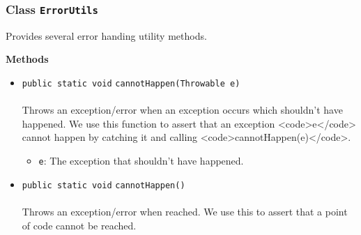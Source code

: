 \subsubsection{Class \lstinline|ErrorUtils|}
Provides several error handing utility methods. \\
\noindent\begin{minipage}[t]{5cm}
\vspace{0.3em}
\hspace*{2em}
\vspace{0.3em}
\end{minipage}





\textbf{\sffamily Methods}
\begin{itemize}
\item \lstinline|public static void| \lstinline|cannotHappen|\lstinline|(Throwable e)|\\ \\[-0.6em]
Throws an exception/error when an exception occurs which shouldn't have happened.
 We use this function to assert that an exception <code>e</code> cannot happen by
 catching it and calling <code>cannotHappen(e)</code>.
\begin{itemize}
\item \lstinline|e|: The exception that shouldn't have happened.
\end{itemize}



\item \lstinline|public static void| \lstinline|cannotHappen|\lstinline|()|\\ \\[-0.6em]
Throws an exception/error when reached. We use this to assert that
 a point of code cannot be reached.



\end{itemize}

